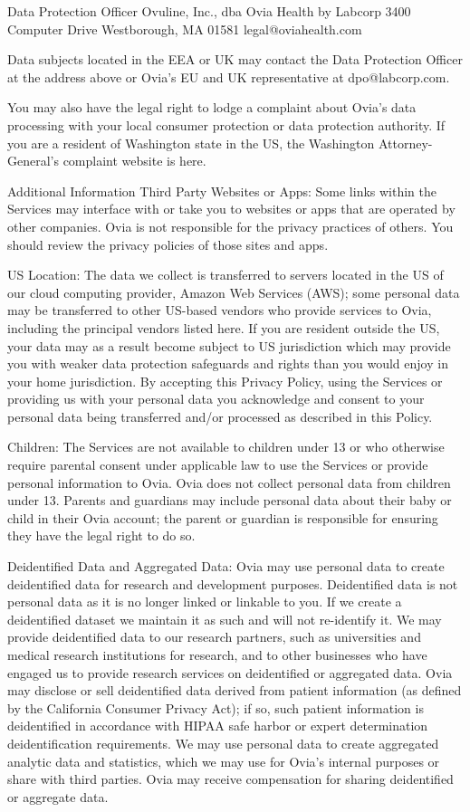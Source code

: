 Data Protection Officer
Ovuline, Inc., dba Ovia Health by Labcorp
3400 Computer Drive
Westborough, MA 01581
legal@oviahealth.com

Data subjects located in the EEA or UK may contact the Data Protection Officer at the address above or Ovia’s EU and UK representative at dpo@labcorp.com.

You may also have the legal right to lodge a complaint about Ovia’s data processing with your local consumer protection or data protection authority.  If you are a resident of Washington state in the US, the Washington Attorney-General’s complaint website is here.

Additional Information
Third Party Websites or Apps: Some links within the Services may interface with or take you to websites or apps that are operated by other companies. Ovia is not responsible for the privacy practices of others. You should review the privacy policies of those sites and apps.

US Location: The data we collect is transferred to servers located in the US of our cloud computing provider, Amazon Web Services (AWS); some personal data may be transferred to other US-based vendors who provide services to Ovia, including the principal vendors listed here. If you are resident outside the US, your data may as a result become subject to US jurisdiction which may provide you with weaker data protection safeguards and rights than you would enjoy in your home jurisdiction. By accepting this Privacy Policy, using the Services or providing us with your personal data you acknowledge and consent to your personal data being transferred and/or processed as described in this Policy.

Children: The Services are not available to children under 13 or who otherwise require parental consent under applicable law to use the Services or provide personal information to Ovia. Ovia does not collect personal data from children under 13. Parents and guardians may include personal data about their baby or child in their Ovia account; the parent or guardian is responsible for ensuring they have the legal right to do so.

Deidentified Data and Aggregated Data: Ovia may use personal data to create deidentified data for research and development purposes. Deidentified data is not personal data as it is no longer linked or linkable to you. If we create a deidentified dataset we maintain it as such and will not re-identify it. We may provide deidentified data to our research partners, such as universities and medical research institutions for research, and to other businesses who have engaged us to provide research services on deidentified or aggregated data. Ovia may disclose or sell deidentified data derived from patient information (as defined by the California Consumer Privacy Act); if so, such patient information is deidentified in accordance with HIPAA safe harbor or expert determination deidentification requirements. We may use personal data to create aggregated analytic data and statistics, which we may use for Ovia’s internal purposes or share with third parties. Ovia may receive compensation for sharing deidentified or aggregate data.


